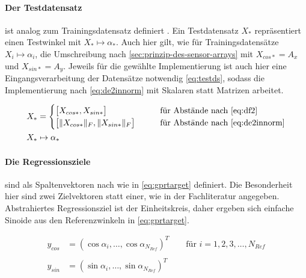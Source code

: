 \paragraph*{Der Testdatensatz} ist analog zum Trainingsdatensatz definiert \cite{Rasmussen2006}. Ein Testdatensatz $X_*$ repräsentiert einen Testwinkel mit $X_* \mapsto \alpha_*$. Auch hier gilt, wie für Trainingsdatensätze $X_i \mapsto \alpha_i$, die Umschreibung nach \autoref{sec:prinzip-des-sensor-arrays} mit $X_{cos*} = A_x$ und $X_{sin*} = A_y$. Jeweils für die gewählte Implementierung ist auch hier eine Eingangsverarbeitung der Datensätze notwendig \autoref{eq:testds}, sodass die Implementierung nach \autoref{eq:de2innorm} mit Skalaren statt Matrizen arbeitet. 


\begin{align}\label{eq:testds}
	X_* &= 
	\begin{cases}
		\big[ X_{cos*}, X_{sin*} \big]             &\qquad \text{für Abstände nach \autoref{eq:df2}} \\
		\big[ \|X_{cos*}\|_F, \|X_{sin*}\|_F \big] &\qquad \text{für Abstände nach \autoref{eq:de2innorm}}
	\end{cases} \\
	X_* & \mapsto \alpha_* \nonumber
\end{align}


\clearpage


\paragraph*{Die Regressionsziele} sind als Spaltenvektoren nach \cite{Rasmussen2006} wie in \autoref{eq:gprtarget} definiert. Die Besonderheit hier sind zwei Zielvektoren statt einer, wie in der Fachliteratur \cite{Rasmussen2006} angegeben. Abstrahiertes Regressionsziel ist der Einheitskreis, daher ergeben sich einfache Sinoide aus den Referenzwinkeln in \autoref{eq:gprtarget}.


\begin{align}\label{eq:gprtarget}
	y_{cos} &= (\cos \alpha_i, \ldots, \cos \alpha_{N_{Ref}})^T \qquad \text{für } i = 1,2,3,\ldots,N_{Ref} \nonumber \\
	\\
	y_{sin} &= (\sin \alpha_i, \ldots, \sin \alpha_{N_{Ref}})^T \nonumber
\end{align}


